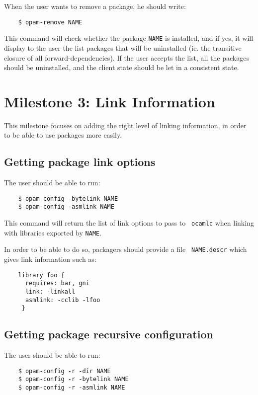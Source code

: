 \documentclass[a4paper,11pt]{article}
\begin{document}
When the user wants to remove a package, he should write:

\begin{verbatim}
    $ opam-remove NAME
\end{verbatim}

This command will check whether the package {\tt NAME} is installed,
and if yes, it will display to the user the list packages that will be
uninstalled (ie. the transitive closure of all forward-dependencies).
If the user accepts the list, all the packages should be uninstalled,
and the client state should be let in a consistent state.

\section{Milestone 3: Link Information}

This milestone focuses on adding the right level of linking
information, in order to be able to use packages more easily.

\subsection{Getting package link options}

The user should be able to run:

\begin{verbatim}
    $ opam-config -bytelink NAME
    $ opam-config -asmlink NAME
\end{verbatim}

This command will return the list of link options to pass to {\tt
  ocamlc} when linking with libraries exported by {\tt NAME}.

In order to be able to do so, packagers should provide a file {\tt
  NAME.descr} which gives link information such as:

\begin{verbatim}
    library foo {
      requires: bar, gni
      link: -linkall
      asmlink: -cclib -lfoo
     }
\end{verbatim}

\subsection{Getting package recursive configuration}

The user should be able to run:

\begin{verbatim}
    $ opam-config -r -dir NAME
    $ opam-config -r -bytelink NAME
    $ opam-config -r -asmlink NAME
\end{verbatim}
\end{document}
